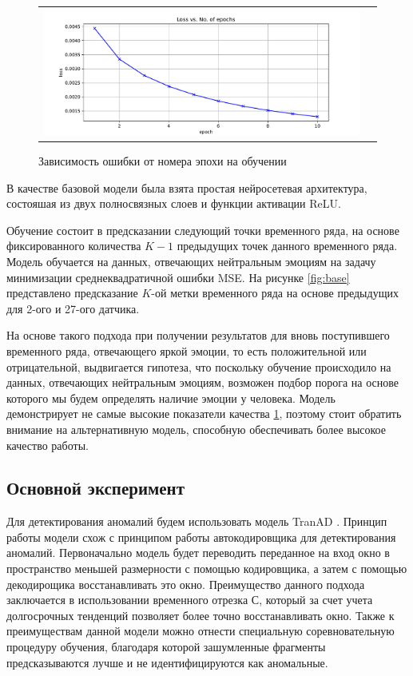 \documentclass{article}
\begin{document}
\begin{figure}[h]
\begin{tabular}{cc}
  \includegraphics[width=160mm]{6.pdf} 
\end{tabular}
\caption{Зависимость ошибки от номера эпохи на обучении}
\label{fig:base_mse}
\end{figure}

В качестве базовой модели была взята простая нейросетевая архитектура, состояшая из двух полносвязных слоев и функции активации ReLU. 

Обучение состоит в предсказании следующий точки временного ряда, на основе фиксированного количества $K - 1$ предыдущих точек данного временного ряда. Модель обучается на данных, отвечающих нейтральным эмоциям на задачу минимизации среднеквадратичной ошибки MSE. На рисунке \ref{fig:base} представлено предсказание $K$-ой метки временного ряда на основе предыдущих для 2-ого и 27-ого датчика.

На основе такого подхода при получении результатов для вновь поступившего временного ряда, отвечающего яркой эмоции, то есть положительной или отрицательной, выдвигается гипотеза, что поскольку обучение происходило на данных, отвечающих нейтральным эмоциям, возможен подбор порога на основе которого мы будем определять наличие эмоции у человека. Модель демонстрирует не самые высокие показатели качества \ref{fig:base_mse}, поэтому стоит обратить внимание на альтернативную модель, способную обеспечивать более высокое качество работы.




\subsection{Основной эксперимент}

Для детектирования аномалий будем использовать модель TranAD \cite{TranAD}. Принцип работы модели схож с принципом работы автокодировщика для детектирования аномалий. Первоначально модель будет переводить переданное на вход окно в пространство меньшей размерности с помощью кодировщика, а затем с помощью декодирощика восстанавливать это окно. Преимущество данного подхода заключается в использовании временного отрезка $С$, который за счет учета долгосрочных тенденций позволяет более точно восстанавливать окно. Также к преимуществам данной модели можно отнести специальную соревновательную процедуру обучения, благодаря которой зашумленные фрагменты предсказываются лучше и не идентифицируются как аномальные.
\end{document}

